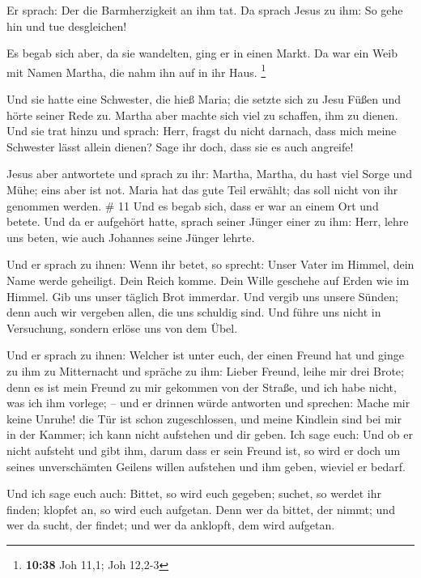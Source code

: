  Er sprach: Der die Barmherzigkeit an ihm tat. Da sprach
Jesus zu ihm: So gehe hin und tue desgleichen!

 Es begab sich aber, da sie wandelten, ging er in einen
Markt. Da war ein Weib mit Namen Martha, die nahm ihn auf in ihr Haus.
\footnote{\textbf{10:38} Joh 11,1; Joh 12,2-3}

 Und sie hatte eine Schwester, die hieß Maria; die setzte
sich zu Jesu Füßen und hörte seiner Rede zu.  Martha aber
machte sich viel zu schaffen, ihm zu dienen. Und sie trat hinzu und
sprach: Herr, fragst du nicht darnach, dass mich meine Schwester lässt
allein dienen? Sage ihr doch, dass sie es auch angreife!

 Jesus aber antwortete und sprach zu ihr: Martha, Martha,
du hast viel Sorge und Mühe;  eins aber ist not. Maria
hat das gute Teil erwählt; das soll nicht von ihr genommen werden. \# 11
 Und es begab sich, dass er war an einem Ort und betete.
Und da er aufgehört hatte, sprach seiner Jünger einer zu ihm: Herr,
lehre uns beten, wie auch Johannes seine Jünger lehrte.

 Und er sprach zu ihnen: Wenn ihr betet, so sprecht: Unser
Vater im Himmel, dein Name werde geheiligt. Dein Reich komme. Dein Wille
geschehe auf Erden wie im Himmel.  Gib uns unser täglich
Brot immerdar.  Und vergib uns unsere Sünden; denn auch
wir vergeben allen, die uns schuldig sind. Und führe uns nicht in
Versuchung, sondern erlöse uns von dem Übel.

 Und er sprach zu ihnen: Welcher ist unter euch, der einen
Freund hat und ginge zu ihm zu Mitternacht und spräche zu ihm: Lieber
Freund, leihe mir drei Brote;  denn es ist mein Freund zu
mir gekommen von der Straße, und ich habe nicht, was ich ihm vorlege; --
 und er drinnen würde antworten und sprechen: Mache mir
keine Unruhe! die Tür ist schon zugeschlossen, und meine Kindlein sind
bei mir in der Kammer; ich kann nicht aufstehen und dir geben.
 Ich sage euch: Und ob er nicht aufsteht und gibt ihm,
darum dass er sein Freund ist, so wird er doch um seines unverschämten
Geilens willen aufstehen und ihm geben, wieviel er bedarf.

 Und ich sage euch auch: Bittet, so wird euch gegeben;
suchet, so werdet ihr finden; klopfet an, so wird euch aufgetan.
 Denn wer da bittet, der nimmt; und wer da sucht, der
findet; und wer da anklopft, dem wird aufgetan.

